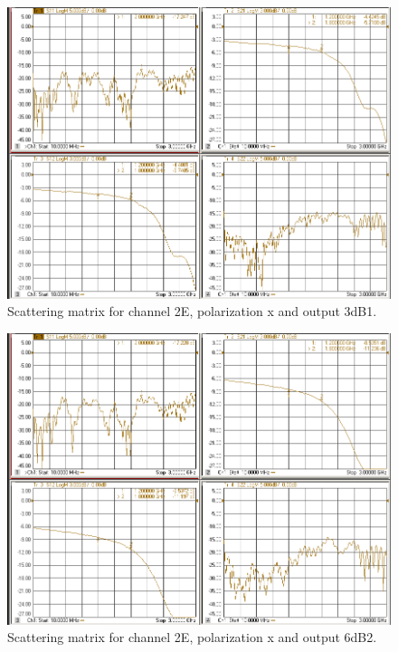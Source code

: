 \documentclass[12pt,a4paper,oneside]{article}
\begin{document}
\begin{figure}[H]
\centering
\includegraphics[width=0.9\linewidth]{VNA_results/2Ex_3dB1.png}
\caption{Scattering matrix for channel 2E, polarization x and output 3dB1.}
\label{fig:2Ex_3dB1}
\end{figure}


\begin{figure}[H]
\centering
\includegraphics[width=0.9\linewidth]{VNA_results/2Ex_6dB2.png}
\caption{Scattering matrix for channel 2E, polarization x and output 6dB2.}
\label{fig:2Ex_6dB2}
\end{figure}
\end{document}
